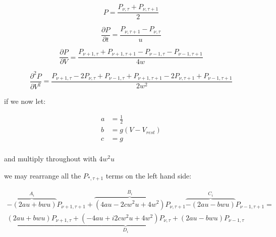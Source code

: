 \documentclass[10pt]{article}
\begin{document}
\begin{equation}
    P = \frac{P_{\nu,\tau} + P_{\nu,\tau + 1}}{2}
\end{equation}

\begin{equation}
    \frac{\partial P}{\partial t} = \frac{P_{\nu,\tau +1 } -
    P_{\nu,\tau}}{u}
\end{equation}

\begin{equation}
    \frac{\partial P}{\partial V} = 
    \frac{P_{\nu +1,\tau } + P_{\nu +1,\tau +1 } -
    P_{\nu - 1,\tau } - P_{\nu -1,\tau +1}} 
    {4w}
\end{equation}

\begin{equation}
    \frac{\partial^2 P}{\partial V^2} = 
    \frac{P_{\nu+1,\tau} - 2 P_{\nu,\tau} + P_{\nu-1,\tau} +
    P_{\nu+1,\tau+1} - 2 P_{\nu,\tau+1} + P_{\nu-1,\tau+1}}
    {2w^2}
\end{equation}

if we now let:

\begin{align*}
a &= \frac{1}{2} \\
b &= g(V - V_{rest}) \\
c &= g \\
\end{align*}

and multiply throughout with $4w^2u$

we may rearrange all the $P_{*,\tau+1} $ terms on the left hand side:

\begin{multline}
    \overbrace{-(2au+bwu)}^{A_i} P_{\nu+1,\tau+1} + 
    \overbrace{(4au - 2cw^2u + 4w^2)}^{B_i} P_{\nu,\tau+1}
    \overbrace{-(2au-bwu)}^{C_i} P_{\nu-1,\tau+1}
    =  \\
    \underbrace{(2au+bwu) P_{\nu+1,\tau} +  
    (-4au +i  2cw^2u + 4w^2) P_{\nu,\tau} + 
    (2au-bwu) P_{\nu-1,\tau}}_{D_i}
\end{multline}
\end{document}
